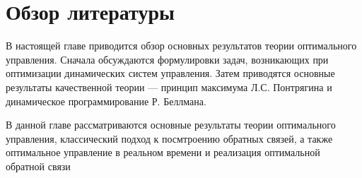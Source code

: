 \chapter{Обзор литературы}\label{chap1}


В настоящей главе приводится обзор основных результатов теории оптимального управления. Сначала обсуждаются формулировки задач, возникающих при оптимизации динамических систем управления. Затем приводятся основные результаты качественной теории --- принцип максимума Л.С. Понтрягина и динамическое программирование Р. Беллмана.

В данной главе рассматриваются основные результаты теории оптимального управления, классический подход к посмтроению обратных связей, а также оптимальное управление в реальном времени и реализация оптимальной обратной связи




